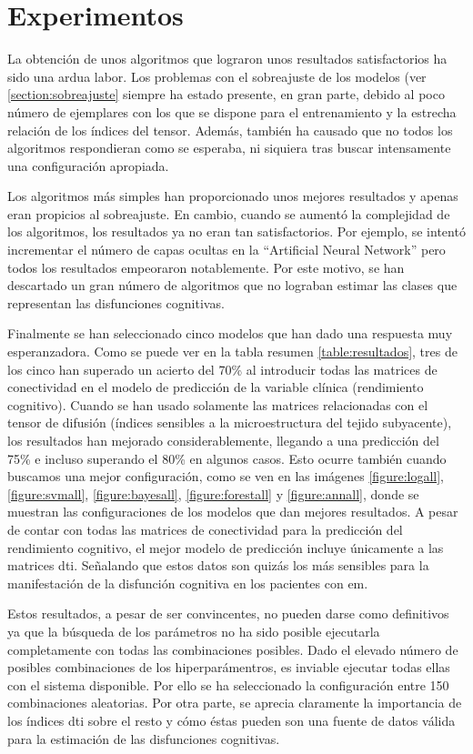 
\section{Experimentos}
La obtención de unos algoritmos que lograron unos resultados satisfactorios ha sido una ardua labor. Los problemas con el sobreajuste de los modelos (ver \ref{section:sobreajuste} siempre ha estado presente, en gran parte, debido al poco número de ejemplares con los que se dispone para el entrenamiento y la estrecha relación de los índices del tensor. Además, también ha causado que no todos los algoritmos respondieran  como se esperaba, ni siquiera tras buscar intensamente una configuración apropiada. 

Los algoritmos más simples han proporcionado unos mejores resultados y apenas eran propicios al sobreajuste. En cambio, cuando se aumentó la complejidad de los algoritmos, los resultados ya no eran tan satisfactorios. Por ejemplo, se intentó incrementar el número de capas ocultas en la ``Artificial Neural Network'' pero todos los resultados empeoraron notablemente. Por este motivo, se han descartado un gran número de algoritmos que no lograban estimar  las clases que representan las disfunciones cognitivas.

Finalmente se han seleccionado cinco modelos que han dado una respuesta muy esperanzadora. Como se puede ver en la tabla resumen \ref{table:resultados}, tres de los cinco han superado un acierto del 70\% al introducir todas las matrices de conectividad en el modelo de predicción de  la variable clínica (rendimiento cognitivo). Cuando se han usado solamente las matrices relacionadas con el tensor de difusión (índices sensibles a la microestructura del tejido subyacente), los resultados han mejorado considerablemente, llegando a una predicción del 75\% e incluso superando el 80\% en algunos casos. Esto ocurre también cuando buscamos una mejor configuración, como se ven en las imágenes 
\ref{figure:logall}, 
\ref{figure:svmall}, 
\ref{figure:bayesall}, 
\ref{figure:forestall} y
\ref{figure:annall}, donde se muestran las configuraciones de los modelos que dan mejores resultados.  A pesar de contar con todas las matrices de conectividad para la predicción del rendimiento cognitivo, el mejor modelo de predicción incluye únicamente a las matrices \gls{dti}. Señalando que estos datos son quizás los más sensibles para la manifestación de la disfunción cognitiva en los pacientes con \gls{em}.

Estos resultados, a pesar de ser convincentes, no pueden darse como definitivos ya que la búsqueda de los parámetros no ha sido posible ejecutarla completamente con todas las combinaciones posibles. Dado el elevado número de posibles combinaciones de los hiperparámentros, es inviable ejecutar todas ellas con el sistema disponible. Por ello se ha seleccionado la configuración entre 150 combinaciones aleatorias. Por otra parte, se aprecia claramente la importancia de los índices \gls{dti} sobre el resto y cómo éstas pueden son una fuente de datos válida para la estimación de las disfunciones cognitivas.

